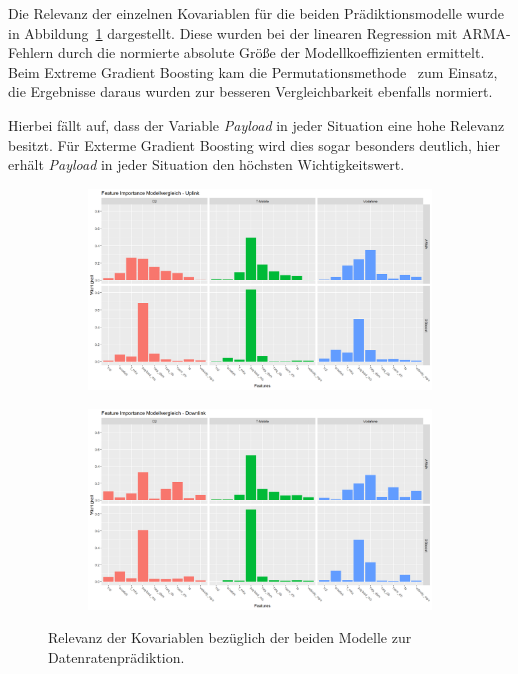 Die Relevanz der einzelnen Kovariablen f\"ur die beiden Pr\"adiktionsmodelle wurde in Abbildung~\ref{fig:feature-importance-datenraten}
dargestellt.
Diese wurden bei der linearen Regression mit ARMA-Fehlern durch die normierte absolute Gr\"o{\ss}e der Modellkoeffizienten ermittelt.
Beim Extreme Gradient Boosting kam die Permutationsmethode~\cite{molnar2019} zum Einsatz, 
die Ergebnisse daraus wurden zur besseren Vergleichbarkeit ebenfalls normiert.

Hierbei f\"allt auf, dass der Variable \textit{Payload} in jeder Situation eine hohe Relevanz besitzt.
F\"ur Exterme Gradient Boosting wird dies sogar besonders deutlich, hier erh\"alt \textit{Payload} in jeder Situation den h\"ochsten
Wichtigkeitswert.
\begin{figure}
\centering
\begin{subfigure}{\textwidth}
    \centering
    \includegraphics[width=\textwidth]{abbildungen/feature_importance_modellvergleich_uplink}
\end{subfigure}
\begin{subfigure}{\textwidth}
    \centering
    \includegraphics[width=\textwidth]{abbildungen/feature_importance_modellvergleich_downlink}
\end{subfigure}
\caption{Relevanz der Kovariablen bez\"uglich der beiden Modelle zur Datenratenpr\"adiktion.}
\label{fig:feature-importance-datenraten}
\end{figure}

